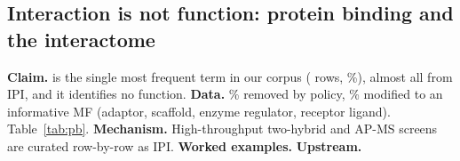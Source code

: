\subsection{Interaction is not function: protein binding and the interactome}\label{sec:dd-pb}
\textbf{Claim.}  is the single most frequent term in our corpus
(\nPB{} rows, \pctPB\%), almost all from IPI, and it identifies no function.
\textbf{Data.} \pbRemove\% removed by policy, \pbModify\% modified to an informative MF
(adaptor, scaffold, enzyme regulator, receptor ligand). Table~\ref{tab:pb}.
\textbf{Mechanism.} High-throughput two-hybrid and AP-MS screens are curated row-by-row as IPI.
\textbf{Worked examples.} 
\textbf{Upstream.} 
\begin{table}[h]\centering\scriptsize\setlength{\tabcolsep}{3pt}
\caption{Actions on protein-binding rows by evidence code.}\label{tab:pb}
\end{table}
